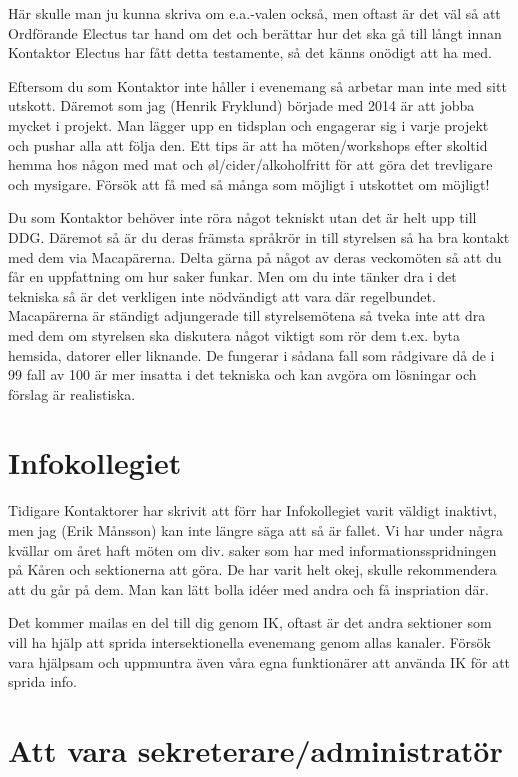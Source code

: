 \documentclass[10pt]{article}
\begin{document}
Här skulle man ju kunna skriva om e.a.-valen också, men oftast är det väl så att Ordförande Electus tar hand om det och berättar hur det ska gå till långt innan Kontaktor Electus har fått detta testamente, så det känns onödigt att ha med.

Eftersom du som Kontaktor inte håller i evenemang så arbetar man inte med sitt utskott. Däremot som jag (Henrik Fryklund) började med 2014 är att jobba mycket i projekt. Man lägger upp en tidsplan och engagerar sig i varje projekt och pushar alla att följa den. Ett tips är att ha möten/workshops efter skoltid hemma hos någon med mat och \o l/cider/alkoholfritt för att göra det trevligare och mysigare. Försök att få med så många som möjligt i utskottet om möjligt!

Du som Kontaktor behöver inte röra något tekniskt utan det är helt upp till DDG. Däremot så är du deras främsta språkrör in till styrelsen så ha bra kontakt med dem via Macapärerna. Delta gärna på något av deras veckomöten så att du får en uppfattning om hur saker funkar. Men om du inte tänker dra i det tekniska så är det verkligen inte nödvändigt att vara där regelbundet. Macapärerna är ständigt adjungerade till styrelsemötena så tveka inte att dra med dem om styrelsen ska diskutera något viktigt som rör dem t.ex. byta hemsida, datorer eller liknande. De fungerar i sådana fall som rådgivare då de i 99 fall av 100 är mer insatta i det tekniska och kan avgöra om lösningar och förslag är realistiska.

\section{Infokollegiet}
Tidigare Kontaktorer har skrivit att förr har Infokollegiet varit väldigt inaktivt, men jag (Erik Månsson) kan inte längre säga att så är fallet. Vi har under några kvällar om året haft möten om div. saker som har med informationsspridningen på Kåren och sektionerna att göra. De har varit helt okej, skulle rekommendera att du går på dem. Man kan lätt bolla idéer med andra och få inspriation där.

Det kommer mailas en del till dig genom IK, oftast är det andra sektioner som vill ha hjälp att sprida intersektionella evenemang genom allas kanaler. Försök vara hjälpsam och uppmuntra även våra egna funktionärer att använda IK för att sprida info.

\section{Att vara sekreterare/administratör}
\end{document}
